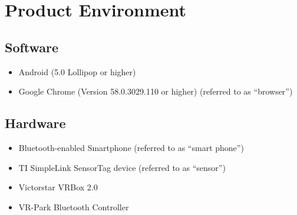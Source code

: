 \section{Product Environment}



\subsection{Software}

\begin{itemize}
  \item Android (5.0 Lollipop or higher)
  \item Google Chrome (Version 58.0.3029.110 or higher) (referred to as ``browser'')
\end{itemize}

\subsection{Hardware}

\begin{itemize}
  \item Bluetooth-enabled Smartphone (referred to as ``smart phone'')
  \item TI SimpleLink SensorTag device (referred to as ``sensor'')
  \item Victorstar VRBox 2.0
  \item VR-Park Bluetooth Controller
\end{itemize}
